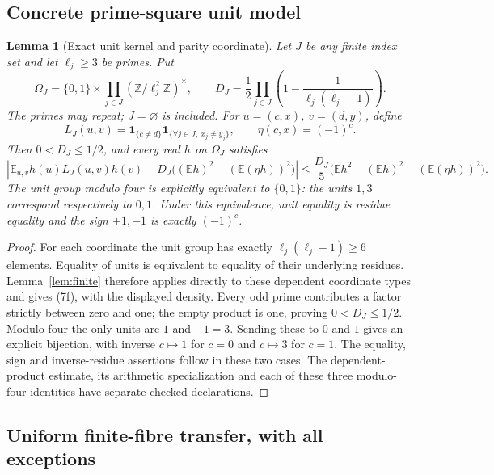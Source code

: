 \documentclass[11pt]{article}
\newtheorem{lemma}{Lemma}
\newcommand{\E}{\mathbb E}
\begin{document}
\subsection{Concrete prime-square unit model}

\begin{lemma}[Exact unit kernel and parity coordinate]\label{lem:unit-model}
Let \(J\) be any finite index set and let \(\ell_j\ge3\) be primes.
Put
\[
 \Omega_J=\{0,1\}\times
     \prod_{j\in J}(\mathbb Z/\ell_j^2\mathbb Z)^\times,\qquad
 D_J=\frac12\prod_{j\in J}
       \left(1-\frac1{\ell_j(\ell_j-1)}\right).
\]
The primes may repeat; \(J=\varnothing\) is included.
For \(u=(c,x)\), \(v=(d,y)\), define
\[
 L_J(u,v)=\mathbf1_{\{c\ne d\}}
            \mathbf1_{\{\forall j\in J,\ x_j\ne y_j\}},
 \qquad \eta(c,x)=(-1)^c .
\]
Then \(0<D_J\le1/2\), and every real \(h\) on \(\Omega_J\)
satisfies
\[
 \left|\E_{u,v}h(u)L_J(u,v)h(v)
        -D_J\bigl((\E h)^2-(\E(\eta h))^2\bigr)\right|
 \le \frac{D_J}{5}
       \bigl(\E h^2-(\E h)^2-(\E(\eta h))^2\bigr).
                                                               \tag{7f}
\]
The unit group modulo four is explicitly equivalent to \(\{0,1\}\):
the units \(1,3\) correspond respectively to \(0,1\).
Under this equivalence, unit equality is residue equality and
the sign \(+1,-1\) is exactly \((-1)^c\).
\end{lemma}
\begin{proof}
For each coordinate the unit group has exactly
\(\ell_j(\ell_j-1)\ge6\) elements.
Equality of units is equivalent to equality of their underlying residues.
Lemma~\ref{lem:finite} therefore applies directly to these dependent
coordinate types and gives (7f), with the displayed density.
Every odd prime contributes a factor strictly between zero and one;
the empty product is one, proving \(0<D_J\le1/2\).
Modulo four the only units are \(1\) and \(-1=3\).
Sending these to \(0\) and \(1\) gives an explicit bijection, with inverse
\(c\mapsto1\) for \(c=0\) and \(c\mapsto3\) for \(c=1\).
The equality, sign and inverse-residue assertions follow in these two cases.
The dependent-product estimate, its arithmetic specialization and each
of these three modulo-four identities have separate checked declarations.
\end{proof}

\subsection{Uniform finite-fibre transfer, with all exceptions}
\end{document}
